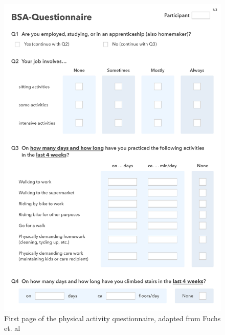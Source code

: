 \begin{appendices}
\clearpage

\begin{figure}[htb]
	\centering
	\begin{minipage}[t]{1\linewidth}
		\centering
		\includegraphics[width=1\linewidth]{Pictures/App_BSA-1}
		\caption{First page of the physical activity questionnaire, adapted from Fuchs et. al~\cite{Fuchs2015-bsa}}
		\label{fig:App_DemographicDataHTG}
	\end{minipage}
\end{figure}


\end{appendices}
